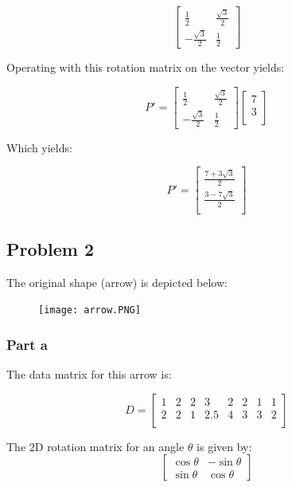 \documentclass{article}
\begin{document}
\[
\begin{bmatrix}
\frac{1}{2} & \frac{\sqrt{3}}{2} \\
-\frac{\sqrt{3}}{2} & \frac{1}{2}
\end{bmatrix}
\]

Operating with this rotation matrix on the vector yields:


\[P ' =
\begin{bmatrix}
\frac{1}{2} & \frac{\sqrt{3}}{2} \\
-\frac{\sqrt{3}}{2} & \frac{1}{2}
\end{bmatrix}
\left[ {\begin{array}{c}
    7 \\
    3 \\
  \end{array} } \right]
\]

Which yields:

\[
  P'= 
  \left[ {\begin{array}{c}
    \frac{7 + 3\sqrt{3}}{2} \\
    \frac{3 - 7\sqrt{3}}{2} \\
  \end{array} } \right]
\]

\subsection*{Problem 2}

The original shape (arrow) is depicted below:

\begin{figure}[H]
  \centering
  \texttt{[image: arrow.PNG]}
  \label{fig3}
\end{figure}

\subsubsection*{Part a}

The data matrix for this arrow is:

\[
  D =
  \left[ {\begin{array}{cccccccc}
    1 & 2 & 2 & 3 & 2 & 2 & 1 & 1\\
    2 & 2 & 1 & 2.5 & 4 & 3 & 3 & 2\\
  \end{array} } \right]
\]

The 2D rotation matrix for an angle $\theta$ is given by:
\[
\begin{bmatrix}
\cos \theta & -\sin \theta \\
\sin \theta & \cos \theta
\end{bmatrix}
\]
\end{document}
